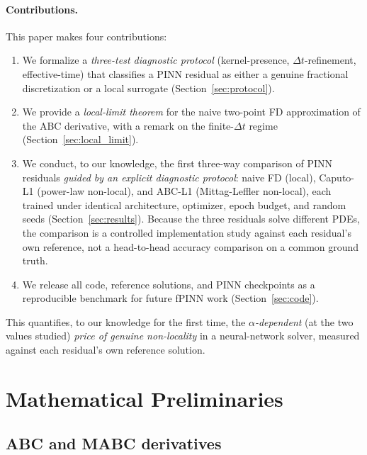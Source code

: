 \documentclass[11pt]{article}
\begin{document}
\paragraph{Contributions.}
This paper makes four contributions:
\begin{enumerate}[label=(\roman*)]
\item We formalize a \emph{three-test diagnostic protocol} (kernel-presence, \(\Delta t\)-refinement, effective-time) that classifies a PINN residual as either a genuine fractional discretization or a local surrogate (Section~\ref{sec:protocol}).
\item We provide a \emph{local-limit theorem} for the naive two-point FD approximation of the ABC derivative, with a remark on the finite-\(\Delta t\) regime (Section~\ref{sec:local_limit}).
\item We conduct, to our knowledge, the first three-way comparison of PINN residuals \emph{guided by an explicit diagnostic protocol}: naive FD (local), Caputo-L1 (power-law non-local), and ABC-L1 (Mittag-Leffler non-local), each trained under identical architecture, optimizer, epoch budget, and random seeds (Section~\ref{sec:results}). Because the three residuals solve different PDEs, the comparison is a controlled implementation study against each residual's own reference, not a head-to-head accuracy comparison on a common ground truth.
\item We release all code, reference solutions, and PINN checkpoints as a reproducible benchmark for future fPINN work (Section~\ref{sec:code}).
\end{enumerate}

This quantifies, to our knowledge for the first time, the \emph{\(\alpha\)-dependent} (at the two values studied) \emph{price of genuine non-locality} in a neural-network solver, measured against each residual's own reference solution.

\section{Mathematical Preliminaries}
\label{sec:prelim}

\subsection{ABC and MABC derivatives}
\label{sec:abc}
\end{document}
